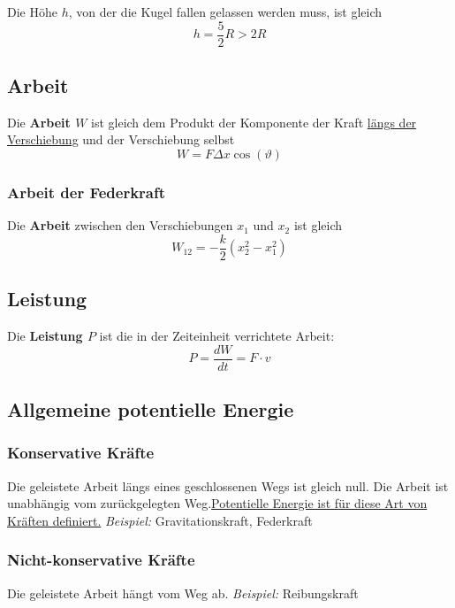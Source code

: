 \documentclass[7pt]{article}
\begin{document}
\begin{multicols*}{3}
Die H{\"o}he $h$, von der die Kugel fallen gelassen werden muss, ist gleich
\begin{equation*}
	h = \frac{5}{2}R > 2R
\end{equation*}

\subsection{Arbeit}

Die \textbf{Arbeit $W$} ist gleich dem Produkt der Komponente der Kraft \underline{l{\"a}ngs der Verschiebung} und der Verschiebung selbst
\begin{equation*}
	W = F\Delta x\cos(\vartheta)
\end{equation*}

\subsubsection{Arbeit der Federkraft}

Die \textbf{Arbeit} zwischen den Verschiebungen $x_1$ und $x_2$ ist gleich
\begin{equation*}
	W_{12} = -\frac{k}{2}(x_2^2-x_1^2)
\end{equation*}

\subsection{Leistung}

Die \textbf{Leistung $P$} ist die in der Zeiteinheit verrichtete Arbeit:
\begin{equation*}
	P = \frac{dW}{dt} = F \cdot v
\end{equation*}

\subsection{Allgemeine potentielle Energie}

\subsubsection{Konservative Kr{\"a}fte}
Die geleistete Arbeit l{\"a}ngs eines geschlossenen Wegs ist gleich null. Die Arbeit ist unabh{\"a}ngig vom zur{\"u}ckgelegten Weg.\underline{Potentielle Energie ist f{\"u}r diese Art von Kr{\"a}ften definiert.}\newline
\emph{Beispiel:} Gravitationskraft, Federkraft

\subsubsection{Nicht-konservative Kr{\"a}fte}
Die geleistete Arbeit h{\"a}ngt vom Weg ab. \newline
\emph{Beispiel:} Reibungskraft


\end{multicols*}
\end{document}
